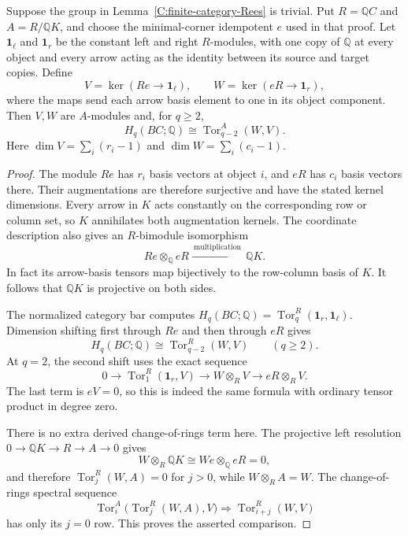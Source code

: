 \begin{lemma}
\label{C:category-band-Tor}
Suppose the group in Lemma~\ref{C:finite-category-Rees} is
trivial. Put $R=\mathbb QC$ and $A=R/\mathbb QK$, and choose
the minimal-corner idempotent $e$ used in that proof.
Let $\mathbf 1_\ell$ and $\mathbf 1_r$ be the constant left
and right $R$-modules, with one copy of $\mathbb Q$ at every
object and every arrow acting as the identity between its
source and target copies. Define
\[
 V=\ker(Re\longrightarrow\mathbf1_\ell),\qquad
 W=\ker(eR\longrightarrow\mathbf1_r),
\]
where the maps send each arrow basis element to one in its
object component. Then $V,W$ are $A$-modules and, for $q\geq2$,
\[
 H_q(BC;\mathbb Q)
       \cong\operatorname{Tor}_{q-2}^{A}(W,V).
\]
Here $\dim V=\sum_i(r_i-1)$ and
$\dim W=\sum_i(c_i-1)$.
\end{lemma}
\begin{proof}
The module $Re$ has $r_i$ basis vectors at object $i$, and
$eR$ has $c_i$ basis vectors there. Their augmentations are
therefore surjective and have the stated kernel dimensions.
Every arrow in $K$ acts constantly on the corresponding row
or column set, so $K$ annihilates both augmentation kernels.
The coordinate description also gives an $R$-bimodule
isomorphism
\[
 Re\otimes_{\mathbb Q}eR\xrightarrow{\ \mathrm{multiplication}\ }
 \mathbb QK.
\]
In fact its arrow-basis tensors map bijectively to the row-column
basis of $K$. It follows that $\mathbb QK$ is projective on
both sides.

The normalized category bar computes
$H_q(BC;\mathbb Q)=\operatorname{Tor}_q^R(\mathbf1_r,\mathbf1_\ell)$.
Dimension shifting first through $Re$ and then through $eR$
gives
\[
 H_q(BC;\mathbb Q)\cong\operatorname{Tor}_{q-2}^R(W,V)
 \qquad(q\geq2).
\]
At $q=2$, the second shift uses the exact sequence
\[
 0\longrightarrow\operatorname{Tor}_1^R(\mathbf1_r,V)
 \longrightarrow W\otimes_R V\longrightarrow eR\otimes_R V.
\]
The last term is $eV=0$, so this is indeed the same formula
with ordinary tensor product in degree zero.

There is no extra derived change-of-rings term here.
The projective left resolution
$0\to\mathbb QK\to R\to A\to0$ gives
\[
 W\otimes_R\mathbb QK
 \cong We\otimes_{\mathbb Q}eR=0,
\]
and therefore $\operatorname{Tor}_j^R(W,A)=0$ for $j>0$,
while $W\otimes_R A=W$. The change-of-rings spectral sequence
\[
 \operatorname{Tor}_i^A\bigl(\operatorname{Tor}_j^R(W,A),V\bigr)
 \Longrightarrow\operatorname{Tor}_{i+j}^R(W,V)
\]
has only its $j=0$ row. This proves the asserted comparison.
\end{proof}

